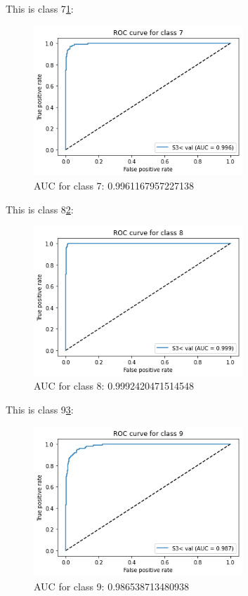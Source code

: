 \documentclass[conference]{IEEEtran}
\begin{document}
This is class 7\ref{Fig.ROC7}:
\begin{figure}[H] 
    \centering %
    \includegraphics[width=0.7\textwidth]{ROC7.png} %
    \caption{AUC for class 7:  0.9961167957227138} %
    \label{Fig.ROC7} %
\end{figure}
This is class 8\ref{Fig.ROC8}:
\begin{figure}[H] 
    \centering %
    \includegraphics[width=0.7\textwidth]{ROC8.png} %
    \caption{AUC for class 8:  0.9992420471514548} %
    \label{Fig.ROC8} %
\end{figure}
This is class 9\ref{Fig.ROC9}:
\begin{figure}[H] 
    \centering %
    \includegraphics[width=0.7\textwidth]{ROC9.png} %
    \caption{AUC for class 9:  0.986538713480938} %
    \label{Fig.ROC9} %
\end{figure}
\end{document}
